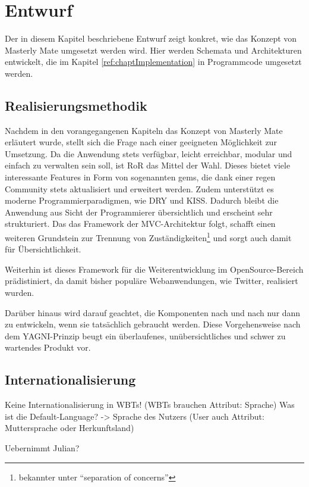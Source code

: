 \chapter{Entwurf}\label{ref:chaptScript}
Der in diesem Kapitel beschriebene Entwurf zeigt konkret, wie das Konzept von
Masterly Mate umgesetzt werden wird. Hier werden Schemata und Architekturen
entwickelt, die im Kapitel \ref{ref:chaptImplementation} in Programmcode
umgesetzt werden.

\section{Realisierungsmethodik}
Nachdem in den vorangegangenen Kapiteln das Konzept von Masterly Mate erläutert
wurde, stellt sich die Frage nach einer geeigneten Möglichkeit zur Umsetzung. Da
die Anwendung stets verfügbar, leicht erreichbar, modular und einfach zu
verwalten sein soll, ist \ac{RoR} das Mittel der Wahl. Dieses bietet viele
interessante Features in Form von sogenannten gems, die dank einer regen
Community stets aktualisiert und erweitert werden. Zudem unterstützt es moderne
Programmierparadigmen, wie \ac{DRY} und \ac{KISS}. Dadurch bleibt die Anwendung
aus Sicht der Programmierer übersichtlich und erscheint sehr strukturiert. Das
das Framework der \ac{MVC}-Architektur folgt, schafft einen weiteren Grundstein
zur Trennung von Zuständigkeiten\footnote{bekannter unter "`separation of
concerns"'} und sorgt auch damit für Übersichtlichkeit. 

Weiterhin ist dieses Framework für die Weiterentwicklung im
OpenSource-Bereich prädistiniert, da damit bisher populäre
Webanwendungen, wie Twitter, realisiert wurden.

Darüber hinaus wird darauf geachtet, die Komponenten nach und nach nur dann zu
entwickeln, wenn sie tatsächlich gebraucht werden. Diese Vorgehensweise nach dem
\ac{YAGNI}-Prinzip beugt ein überlaufenes, unübersichtliches und schwer
zu wartendes Produkt vor.

\section{Internationalisierung}\label{ref:internationalisierung}
\begin{k}
Keine Internationalisierung in WBTs! (WBTs brauchen Attribut: Sprache)
Was ist die Default-Language? -> Sprache des Nutzers (User auch Attribut:
Muttersprache oder Herkunftsland)

Uebernimmt Julian?
\end{k}

